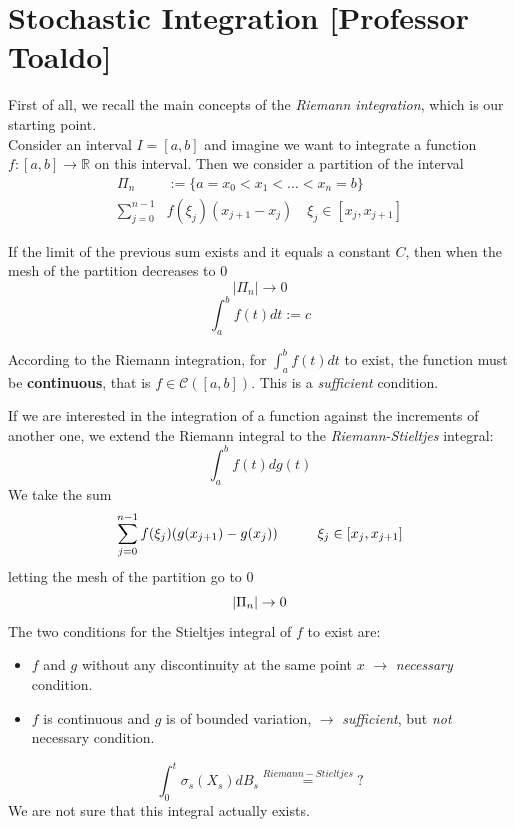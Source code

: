 \chapter{Stochastic Integration [Professor Toaldo]}
First of all, we recall the main concepts of the \emph{Riemann integration}, which is our starting point. \\
Consider an interval $I=[a,b]$ and imagine we want to integrate a function $f: [a,b] \to \mathbb{R}$ on this interval. Then we consider a partition of the interval 
\begin{equation*}
\begin{split}
     \Pi_n &:= \{a = x_0 < x_1 < \ldots < x_n = b\}\\
    \sum_{j=0}^{n-1} &f(\xi_j) (x_{j+1} - x_j) \quad \xi_j \in [x_j, x_{j+1}]
\end{split}
\end{equation*}

If the limit of the previous sum exists and it equals a constant $C$, then when the mesh of the partition decreases to $0$
\begin{equation*}
    |\Pi_n| \rightarrow 0 
\end{equation*}
\begin{equation}
    \int_a^b f(t) dt:= c
\end{equation}
\begin{remark}
    According to the Riemann integration, for $\int_a^b f(t) dt$ to exist, the function must be \textbf{continuous}, that is $f \in \mathcal{C}([a,b])$. This is a \emph{sufficient} condition. 
\end{remark}
If we are interested in the integration of a function against the increments of another one, we extend the Riemann integral to the \emph{Riemann-Stieltjes} integral:
\begin{equation*}
    \int_a^b f(t)dg(t)
\end{equation*}
We take the sum
\begin{equation*}
    \sum_{j=0}^{n-1} f(\xi_j)(g(x_{j+1})-g(x_j)) \hspace{1 cm} \xi_j \in [x_j, x_{j+1}]
\end{equation*}
letting the mesh of the partition go to $0$
\begin{equation*}
    |\Pi_n|\rightarrow 0
\end{equation*}
The two conditions for the Stieltjes integral of $f$ to exist are:
\begin{itemize}
    \item $f$ and $g$ without any discontinuity at the same point $x$ $\rightarrow$ \emph{necessary} condition.
    \item $f$ is continuous and $g$ is of bounded variation, $\rightarrow$ \emph{sufficient}, but \emph{not} necessary condition.
\end{itemize}
\begin{equation}
    \int_0^t \sigma_s(X_s) dB_s \stackrel{Riemann-Stieltjes} = ?
\end{equation}
We are not sure that this integral actually exists. 

